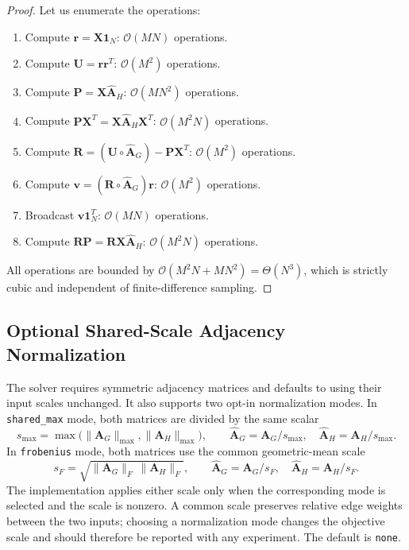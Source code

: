 \documentclass[conference]{IEEEtran}
\begin{document}
\begin{proof}
Let us enumerate the operations:
\begin{enumerate}
    \item Compute $\mathbf{r} = \mathbf{X}\mathbf{1}_N$: $\mathcal{O}(MN)$ operations.
    \item Compute $\mathbf{U} = \mathbf{r}\mathbf{r}^T$: $\mathcal{O}(M^2)$ operations.
    \item Compute $\mathbf{P} = \mathbf{X}\hat{\mathbf{A}}_H$: $\mathcal{O}(MN^2)$ operations.
    \item Compute $\mathbf{P}\mathbf{X}^T = \mathbf{X}\hat{\mathbf{A}}_H\mathbf{X}^T$: $\mathcal{O}(M^2N)$ operations.
    \item Compute $\mathbf{R} = (\mathbf{U} \circ \hat{\mathbf{A}}_G) - \mathbf{P}\mathbf{X}^T$: $\mathcal{O}(M^2)$ operations.
    \item Compute $\mathbf{v} = (\mathbf{R} \circ \hat{\mathbf{A}}_G)\mathbf{r}$: $\mathcal{O}(M^2)$ operations.
    \item Broadcast $\mathbf{v}\mathbf{1}_N^T$: $\mathcal{O}(MN)$ operations.
    \item Compute $\mathbf{R}\mathbf{P} = \mathbf{R}\mathbf{X}\hat{\mathbf{A}}_H$: $\mathcal{O}(M^2N)$ operations.
\end{enumerate}
All operations are bounded by $\mathcal{O}(M^2N + MN^2) = \Theta(N^3)$, which is strictly cubic and independent of finite-difference sampling.
\end{proof}

\subsection{Optional Shared-Scale Adjacency Normalization}
The solver requires symmetric adjacency matrices and defaults to using their input scales unchanged. It also supports two opt-in normalization modes. In \texttt{shared\_max} mode, both matrices are divided by the same scalar
\begin{equation}
s_{\max} = \max\big(\|\mathbf{A}_G\|_{\max},\|\mathbf{A}_H\|_{\max}\big), \qquad
\hat{\mathbf{A}}_G=\mathbf{A}_G/s_{\max},\quad \hat{\mathbf{A}}_H=\mathbf{A}_H/s_{\max}.
\label{eq:shared_scale}
\end{equation}
In \texttt{frobenius} mode, both matrices use the common geometric-mean scale
\begin{equation}
s_F = \sqrt{\|\mathbf{A}_G\|_F\,\|\mathbf{A}_H\|_F}, \qquad
\hat{\mathbf{A}}_G=\mathbf{A}_G/s_F,\quad \hat{\mathbf{A}}_H=\mathbf{A}_H/s_F.
\end{equation}
The implementation applies either scale only when the corresponding mode is selected and the scale is nonzero. A common scale preserves relative edge weights between the two inputs; choosing a normalization mode changes the objective scale and should therefore be reported with any experiment. The default is \texttt{none}.
\end{document}
